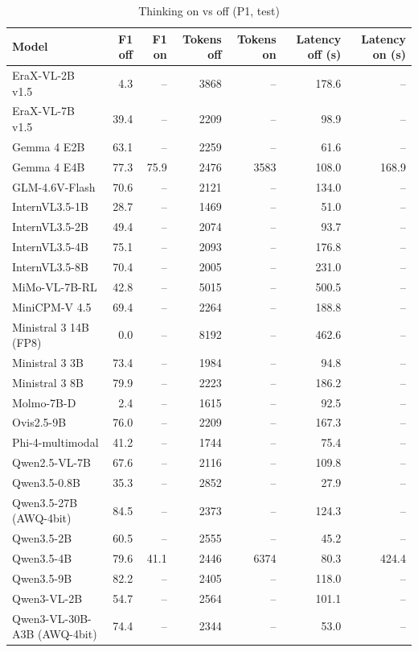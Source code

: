 \begin{table}[t]
\centering
\caption{Thinking on vs off (P1, test)}
\label{tab:thinking}
\small
\begin{tabular}{lrrrrrr}
\toprule
Model & F1 off & F1 on & Tokens off & Tokens on & Latency off (s) & Latency on (s) \\
\midrule
EraX-VL-2B v1.5 & 4.3 & – & 3868 & – & 178.6 & – \\
EraX-VL-7B v1.5 & 39.4 & – & 2209 & – & 98.9 & – \\
Gemma 4 E2B & 63.1 & – & 2259 & – & 61.6 & – \\
Gemma 4 E4B & 77.3 & 75.9 & 2476 & 3583 & 108.0 & 168.9 \\
GLM-4.6V-Flash & 70.6 & – & 2121 & – & 134.0 & – \\
InternVL3.5-1B & 28.7 & – & 1469 & – & 51.0 & – \\
InternVL3.5-2B & 49.4 & – & 2074 & – & 93.7 & – \\
InternVL3.5-4B & 75.1 & – & 2093 & – & 176.8 & – \\
InternVL3.5-8B & 70.4 & – & 2005 & – & 231.0 & – \\
MiMo-VL-7B-RL & 42.8 & – & 5015 & – & 500.5 & – \\
MiniCPM-V 4.5 & 69.4 & – & 2264 & – & 188.8 & – \\
Ministral 3 14B (FP8) & 0.0 & – & 8192 & – & 462.6 & – \\
Ministral 3 3B & 73.4 & – & 1984 & – & 94.8 & – \\
Ministral 3 8B & 79.9 & – & 2223 & – & 186.2 & – \\
Molmo-7B-D & 2.4 & – & 1615 & – & 92.5 & – \\
Ovis2.5-9B & 76.0 & – & 2209 & – & 167.3 & – \\
Phi-4-multimodal & 41.2 & – & 1744 & – & 75.4 & – \\
Qwen2.5-VL-7B & 67.6 & – & 2116 & – & 109.8 & – \\
Qwen3.5-0.8B & 35.3 & – & 2852 & – & 27.9 & – \\
Qwen3.5-27B (AWQ-4bit) & 84.5 & – & 2373 & – & 124.3 & – \\
Qwen3.5-2B & 60.5 & – & 2555 & – & 45.2 & – \\
Qwen3.5-4B & 79.6 & 41.1 & 2446 & 6374 & 80.3 & 424.4 \\
Qwen3.5-9B & 82.2 & – & 2405 & – & 118.0 & – \\
Qwen3-VL-2B & 54.7 & – & 2564 & – & 101.1 & – \\
Qwen3-VL-30B-A3B (AWQ-4bit) & 74.4 & – & 2344 & – & 53.0 & – \\

\end{tabular}
\end{table}
